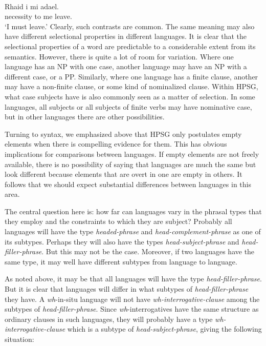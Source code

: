 \documentclass[output=paper]{langsci/langscibook}
\begin{document}
\ea\label{ex:borsley:4.15}\\
    \gll Rhaid i mi adael.\\
            necessity to me leave.\Inf{}\\
    \glt    \enquote*{I must leave.}
\z
%
Clearly, such contrasts are common. The same meaning may also have different
selectional properties in different languages. It is clear that the selectional
properties of a word are predictable to a considerable extent from its
semantics. However, there is quite a lot of room for variation. Where one
language has an NP with one case, another language may have an NP with a
different case, or a PP. Similarly, where one language has a finite clause,
another may have a non-finite clause, or some kind of nominalized clause.
Within \gls{HPSG}, what case subjects have is also commonly seen as a matter of
selection. In some languages, all subjects or all subjects of finite verbs may
have nominative case, but in other languages there are other possibilities.

Turning to syntax, we emphasized above that \gls{HPSG} only postulates empty elements
when there is compelling evidence for them. This has obvious implications for
comparisons between languages. If empty elements are not freely available,
there is no possibility of saying that languages are much the same but look
different because elements that are overt in one are empty in others. It
follows that we should expect substantial differences between languages in this
area.

The central question here is: how far can languages vary in the phrasal types
that they employ and the constraints to which they are subject? Probably all
languages will have the type \emph{headed-phrase} and
\emph{head-complement-phrase} as one of its subtypes. Perhaps they will also
have the types \emph{head-subject-phrase} and \emph{head-filler-phrase}. But
this may not be the case. Moreover, if two languages have the same type, it may
well have different subtypes from language to language.

As noted above, it may be that all languages will have the type
\emph{head-filler-phrase}. But it is clear that languages will differ in what
subtypes of \emph{head-filler-phrase} they have. A \emph{wh}-in-situ language
will not have \emph{wh-interrogative-clause} among the subtypes of
\emph{head-filler-phrase}. Since \emph{wh}-interrogatives have the same
structure as ordinary clauses in such languages, they will probably have a type
\emph{wh-interrogative-clause} which is a subtype of
\emph{head-subject-phrase}, giving the following situation:
\end{document}
